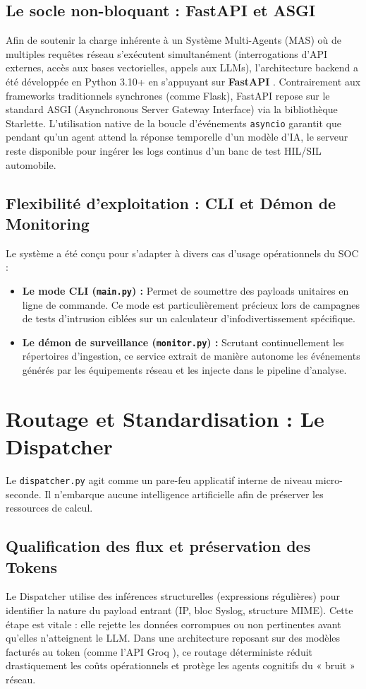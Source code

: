 \documentclass[a4paper, 12pt]{report}
\begin{document}
\subsection{Le socle non-bloquant : FastAPI et ASGI}
Afin de soutenir la charge inhérente à un Système Multi-Agents (MAS) où de multiples requêtes réseau s'exécutent simultanément (interrogations d'API externes, accès aux bases vectorielles, appels aux LLMs), l'architecture backend a été développée en Python 3.10+ en s'appuyant sur \textbf{FastAPI} \cite{fastapi}. Contrairement aux frameworks traditionnels synchrones (comme Flask), FastAPI repose sur le standard ASGI (Asynchronous Server Gateway Interface) via la bibliothèque Starlette. L'utilisation native de la boucle d'événements \texttt{asyncio} garantit que pendant qu'un agent attend la réponse temporelle d'un modèle d'IA, le serveur reste disponible pour ingérer les logs continus d'un banc de test HIL/SIL automobile.

\subsection{Flexibilité d'exploitation : CLI et Démon de Monitoring}
Le système a été conçu pour s'adapter à divers cas d'usage opérationnels du SOC :
\begin{itemize}
    \item \textbf{Le mode CLI (\texttt{main.py}) :} Permet de soumettre des payloads unitaires en ligne de commande. Ce mode est particulièrement précieux lors de campagnes de tests d'intrusion ciblées sur un calculateur d'infodivertissement spécifique.
    \item \textbf{Le démon de surveillance (\texttt{monitor.py}) :} Scrutant continuellement les répertoires d'ingestion, ce service extrait de manière autonome les événements générés par les équipements réseau et les injecte dans le pipeline d'analyse.
\end{itemize}

\section{Routage et Standardisation : Le Dispatcher}
\label{sec:dispatcher}

Le \texttt{dispatcher.py} agit comme un pare-feu applicatif interne de niveau micro-seconde. Il n'embarque aucune intelligence artificielle afin de préserver les ressources de calcul.

\subsection{Qualification des flux et préservation des Tokens}
Le Dispatcher utilise des inférences structurelles (expressions régulières) pour identifier la nature du payload entrant (IP, bloc Syslog, structure MIME). Cette étape est vitale : elle rejette les données corrompues ou non pertinentes avant qu'elles n'atteignent le LLM. Dans une architecture reposant sur des modèles facturés au token (comme l'API Groq \cite{openai_gpt4}), ce routage déterministe réduit drastiquement les coûts opérationnels et protège les agents cognitifs du « bruit » réseau.
\end{document}
